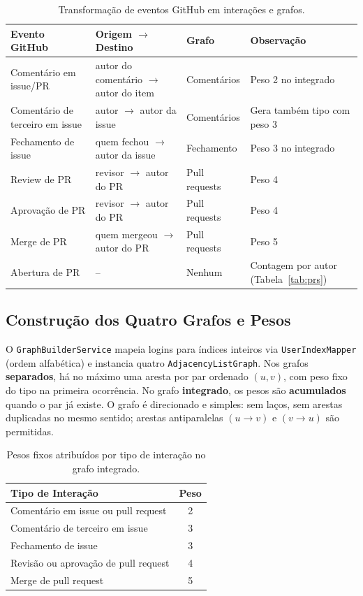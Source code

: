 \documentclass[12pt]{article}
\begin{document}
\begin{table}[H]
\centering
\caption{Transformação de eventos GitHub em interações e grafos.}
\small
\begin{tabular}{|p{3.5cm}|p{2.8cm}|p{2.1cm}|p{4.0cm}|}
\hline
\textbf{Evento GitHub} & \textbf{Origem $\rightarrow$ Destino} & \textbf{Grafo} & \textbf{Observação} \\
\hline Comentário em issue/PR & autor do comentário $\rightarrow$ autor do item & Comentários & Peso 2 no integrado \\
\hline Comentário de terceiro em issue & autor $\rightarrow$ autor da issue & Comentários & Gera também tipo com peso 3 \\
\hline Fechamento de issue & quem fechou $\rightarrow$ autor da issue & Fechamento & Peso 3 no integrado \\
\hline Review de PR & revisor $\rightarrow$ autor do PR & Pull requests & Peso 4 \\
\hline Aprovação de PR & revisor $\rightarrow$ autor do PR & Pull requests & Peso 4 \\
\hline Merge de PR & quem mergeou $\rightarrow$ autor do PR & Pull requests & Peso 5 \\
\hline Abertura de PR & -- & Nenhum & Contagem por autor (Tabela~\ref{tab:prs}) \\
\hline
\end{tabular}
\label{tab:mapeamento}
\end{table}

\subsection{Construção dos Quatro Grafos e Pesos}

O \texttt{GraphBuilderService} mapeia logins para índices inteiros via \texttt{UserIndexMapper} (ordem alfabética) e instancia quatro \texttt{AdjacencyListGraph}. Nos grafos \textbf{separados}, há no máximo uma aresta por par ordenado $(u,v)$, com peso fixo do tipo na primeira ocorrência. No grafo \textbf{integrado}, os pesos são \textbf{acumulados} quando o par já existe. O grafo é direcionado e simples: sem laços, sem arestas duplicadas no mesmo sentido; arestas antiparalelas $(u \rightarrow v)$ e $(v \rightarrow u)$ são permitidas.

\begin{table}[H]
\centering
\caption{Pesos fixos atribuídos por tipo de interação no grafo integrado.}
\vspace{0.2cm}
\begin{tabular}{|l|c|}
\hline
\textbf{Tipo de Interação} & \textbf{Peso} \\ \hline
Comentário em issue ou pull request & 2 \\ \hline
Comentário de terceiro em issue & 3 \\ \hline
Fechamento de issue & 3 \\ \hline
Revisão ou aprovação de pull request & 4 \\ \hline
Merge de pull request & 5 \\ \hline
\end{tabular}
\label{tab:pesos}
\end{table}
\end{document}
